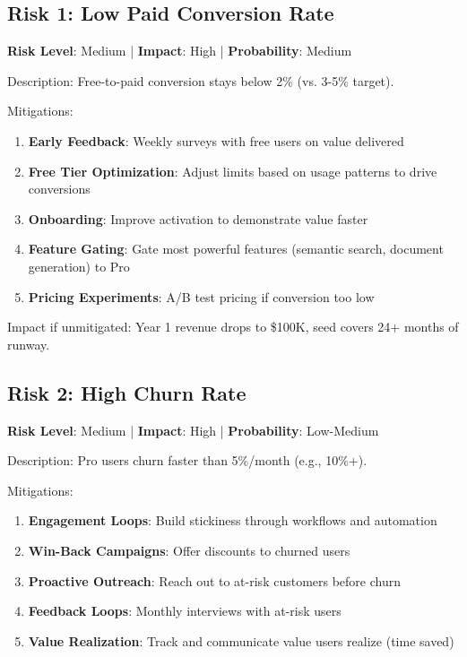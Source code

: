 \documentclass{report}
\begin{document}
\subsection{Risk 1: Low Paid Conversion Rate}

\textbf{Risk Level}: Medium | \textbf{Impact}: High | \textbf{Probability}: Medium

Description: Free-to-paid conversion stays below 2\% (vs. 3-5\% target).

Mitigations:
\begin{enumerate}
    \item \textbf{Early Feedback}: Weekly surveys with free users on value delivered
    \item \textbf{Free Tier Optimization}: Adjust limits based on usage patterns to drive conversions
    \item \textbf{Onboarding}: Improve activation to demonstrate value faster
    \item \textbf{Feature Gating}: Gate most powerful features (semantic search, document generation) to Pro
    \item \textbf{Pricing Experiments}: A/B test pricing if conversion too low
\end{enumerate}

Impact if unmitigated: Year 1 revenue drops to \$100K, seed covers 24+ months of runway.

\subsection{Risk 2: High Churn Rate}

\textbf{Risk Level}: Medium | \textbf{Impact}: High | \textbf{Probability}: Low-Medium

Description: Pro users churn faster than 5\%/month (e.g., 10\%+).

Mitigations:
\begin{enumerate}
    \item \textbf{Engagement Loops}: Build stickiness through workflows and automation
    \item \textbf{Win-Back Campaigns}: Offer discounts to churned users
    \item \textbf{Proactive Outreach}: Reach out to at-risk customers before churn
    \item \textbf{Feedback Loops}: Monthly interviews with at-risk users
    \item \textbf{Value Realization}: Track and communicate value users realize (time saved)
\end{enumerate}
\end{document}
